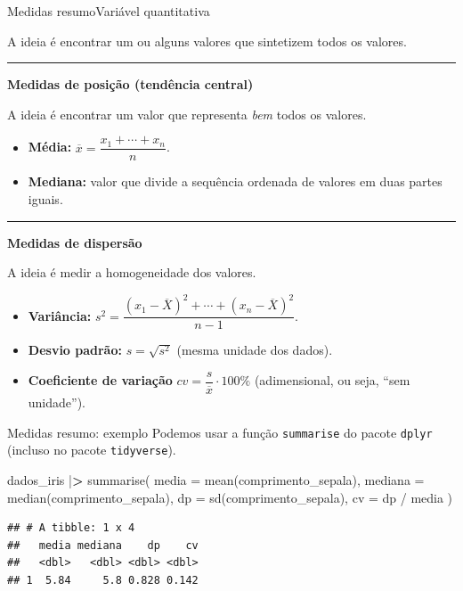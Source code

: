\documentclass[
  10pt,
  ignorenonframetext,
]{beamer}
\newenvironment{Shaded}{}{}
\newcommand{\DataTypeTok}[1]{#1}
\newcommand{\ErrorTok}[1]{\textcolor[rgb]{1.00,0.00,0.00}{\textbf{#1}}}
\newcommand{\KeywordTok}[1]{\textcolor[rgb]{0.00,0.00,1.00}{#1}}
\newcommand{\NormalTok}[1]{#1}
\newcommand{\OperatorTok}[1]{#1}
\newcommand{\StringTok}[1]{\textcolor[rgb]{0.00,0.50,0.50}{#1}}
\providecommand{\tightlist}{%
  \setlength{\itemsep}{0pt}\setlength{\parskip}{0pt}}
\begin{document}
\begin{frame}{Medidas resumo\newline Variável quantitativa}
\protect\hypertarget{medidas-resumovariuxe1vel-quantitativa}{}
\small

A ideia é encontrar um ou alguns valores que sintetizem todos os
valores.

\rule{\textwidth}{0.5pt}

\textbf{Medidas de posição (tendência central)}

A ideia é encontrar um valor que representa \emph{bem} todos os valores.

\begin{itemize}
\tightlist
\item
  \textbf{Média:} \(\overline{x} = \dfrac{x_1+\cdots+x_n}{n}\).
\item
  \textbf{Mediana:} valor que divide a sequência ordenada de valores em
  duas partes iguais.
\end{itemize}

\rule{\textwidth}{0.5pt}

\textbf{Medidas de dispersão}

A ideia é medir a homogeneidade dos valores.

\begin{itemize}
\tightlist
\item
  \textbf{Variância: }
  \(s^2 = \dfrac{(x_1 - \overline{X})^2 + \cdots + (x_n - \overline{X})^2}{n-1}\).
\item
  \textbf{Desvio padrão: } \(s = \sqrt{s^2}\) (mesma unidade dos dados).
\item
  \textbf{Coeficiente de variação}
  \(cv= \dfrac{s}{\overline{x}} \cdot 100\%\) (adimensional, ou seja,
  ``sem unidade'').
\end{itemize}

\normalsize
\end{frame}

\begin{frame}[fragile]{Medidas resumo: exemplo}
\protect\hypertarget{medidas-resumo-exemplo}{}
Podemos usar a função \texttt{summarise} do pacote \texttt{dplyr}
(incluso no pacote \texttt{tidyverse}).

\begin{Shaded}
\begin{Highlighting}[]
\NormalTok{dados\_iris }\OperatorTok{|}\ErrorTok{\textgreater{}}
\StringTok{  }\KeywordTok{summarise}\NormalTok{(}
    \DataTypeTok{media =} \KeywordTok{mean}\NormalTok{(comprimento\_sepala),}
    \DataTypeTok{mediana =} \KeywordTok{median}\NormalTok{(comprimento\_sepala),}
    \DataTypeTok{dp =} \KeywordTok{sd}\NormalTok{(comprimento\_sepala),}
    \DataTypeTok{cv =}\NormalTok{ dp }\OperatorTok{/}\StringTok{ }\NormalTok{media}
\NormalTok{  )}
\end{Highlighting}
\end{Shaded}

\begin{verbatim}
## # A tibble: 1 x 4
##   media mediana    dp    cv
##   <dbl>   <dbl> <dbl> <dbl>
## 1  5.84     5.8 0.828 0.142
\end{verbatim}
\end{frame}
\end{document}
